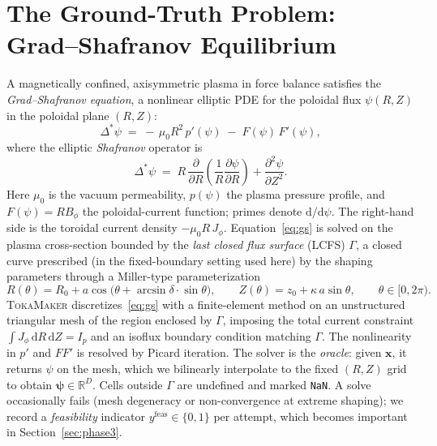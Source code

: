 \documentclass[11pt]{article}
\newcommand{\R}{\mathbb{R}}
\newcommand{\x}{\bm{x}}
\newcommand{\psiv}{\bm{\psi}}
\newcommand{\lcfs}{\Gamma}
\begin{document}
\section{The Ground-Truth Problem: Grad--Shafranov Equilibrium}
\label{sec:gs}

A magnetically confined, axisymmetric plasma in force balance satisfies the
\emph{Grad--Shafranov equation}, a nonlinear elliptic PDE for the poloidal
flux $\psi(R,Z)$ in the poloidal plane $(R,Z)$:
\begin{equation}
  \Delta^{\!*}\psi
  \;=\; -\,\mu_0 R^2\, p'(\psi)\;-\;F(\psi)\,F'(\psi),
  \label{eq:gs}
\end{equation}
where the elliptic \emph{Shafranov} operator is
\begin{equation}
  \Delta^{\!*}\psi
  \;=\; R\,\frac{\partial}{\partial R}\!\left(\frac{1}{R}\frac{\partial \psi}{\partial R}\right)
  + \frac{\partial^2 \psi}{\partial Z^2}.
\end{equation}
Here $\mu_0$ is the vacuum permeability, $p(\psi)$ the plasma pressure profile,
and $F(\psi)=R B_\phi$ the poloidal-current function; primes denote
$\mathrm{d}/\mathrm{d}\psi$. The right-hand side is the toroidal current density
$-\mu_0 R\, J_\phi$. Equation~\eqref{eq:gs} is solved on the plasma
cross-section bounded by the \emph{last closed flux surface} (LCFS)
$\lcfs$, a closed curve prescribed (in the fixed-boundary setting used here)
by the shaping parameters through a Miller-type parameterization
\begin{equation}
  R(\theta) = R_0 + a\cos\!\big(\theta + \arcsin\delta \cdot \sin\theta\big),
  \qquad
  Z(\theta) = z_0 + \kappa\, a \sin\theta,
  \qquad \theta \in [0,2\pi).
  \label{eq:lcfs}
\end{equation}
\textsc{TokaMaker} discretizes~\eqref{eq:gs} with a finite-element method on an
unstructured triangular mesh of the region enclosed by $\lcfs$, imposing the
total current constraint $\int J_\phi \,\mathrm{d}R\,\mathrm{d}Z = I_p$ and an
isoflux boundary condition matching $\lcfs$. The nonlinearity in $p'$ and
$FF'$ is resolved by Picard iteration. The solver is the \emph{oracle}: given
$\x$, it returns $\psi$ on the mesh, which we bilinearly interpolate to the
fixed $(R,Z)$ grid to obtain $\psiv \in \R^{D}$. Cells outside $\lcfs$ are
undefined and marked \texttt{NaN}. A solve occasionally fails (mesh
degeneracy or non-convergence at extreme shaping); we record a
\emph{feasibility} indicator $y^{\mathrm{feas}} \in \{0,1\}$ per attempt,
which becomes important in Section~\ref{sec:phase3}.
\end{document}
